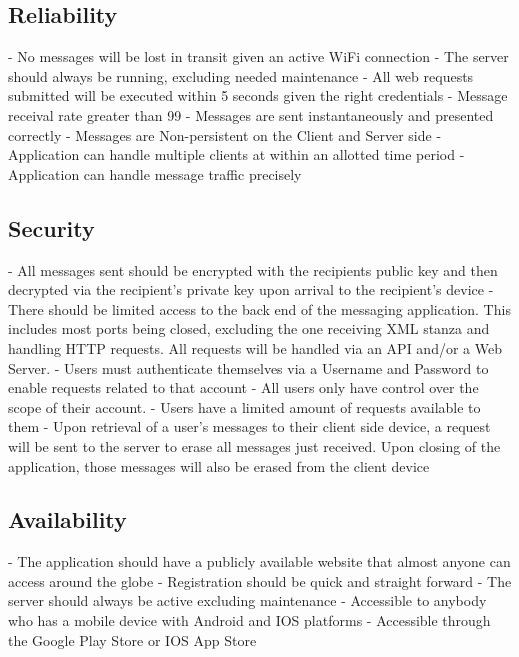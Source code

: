 \documentclass[11pt]{article}
\theoremstyle{plain}
\theoremstyle{definition}
\begin{document}
\subsection{Reliability}
- No messages will be lost in transit given an active WiFi connection
  \newline
- The server should always be running, excluding needed maintenance
  \newline
- All web requests submitted will be executed within 5 seconds given the right 
  credentials
    \newline
- Message receival rate greater than 99%
- Messages are sent instantaneously and presented correctly
- Messages are Non-persistent on the Client and Server side
- Application can handle multiple clients at within an allotted time period
- Application can handle message traffic precisely

\subsection{Security}
- All messages sent should be encrypted with the recipients public key and then decrypted 
  via the recipient's private key upon arrival to the recipient's device
    \newline
- There should be limited access to the back end of the messaging application. This 
  includes most ports being closed, excluding the one receiving XML stanza and handling HTTP requests. All requests will be handled via an API and/or a Web Server.
    \newline
- Users must authenticate themselves via a Username and Password to enable requests related 
  to that account
    \newline
- All users only have control over the scope of their account.
  \newline
- Users have a limited amount of requests available to them
  \newline
- Upon retrieval of a user's messages to their client side device, a request will be sent to the server to erase all messages just received. Upon closing of the application, those messages will also be erased from the client device
  \newline
  
\subsection{Availability}
- The application should have a publicly available website that almost anyone can access 
  around the globe \newline
- Registration should be quick and straight forward \newline
- The server should always be active excluding maintenance \newline
- Accessible to anybody who has a mobile device with Android and IOS platforms \newline
- Accessible through the Google Play Store or IOS App Store \newline
\end{document}

